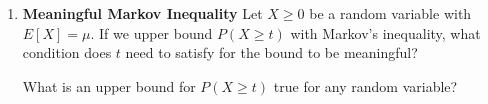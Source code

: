 \documentclass[11pt,preview]{standalone} %
\newcommand{\E}{\mathbb{E}}
\begin{document}
\begin{enumerate}
\begin{enumerate}
\end{enumerate}


\item {\bf Meaningful Markov Inequality} Let $X \geq 0$ be a random variable with $E[X] = \mu$. If we upper bound $P(X \geq t)$ with Markov's inequality, what condition does $t$ need to satisfy for the bound to be meaningful?
\begin{Choices}
\Hint What is an upper bound for $P(X \geq t)$ true for any random variable?


\end{Choices}
\end{enumerate}
\end{document}

